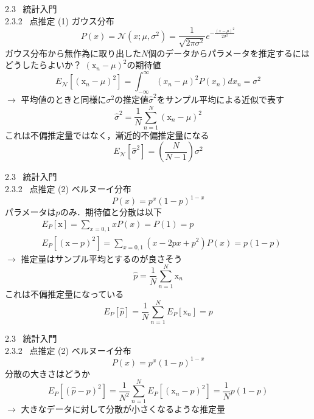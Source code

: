 \documentclass[dvipdfmx,10pt]{beamer}
\begin{document}
  \begin{frame}[t]{2.3 \ 統計入門 \\ \normalsize{2.3.2 \ 点推定}}
    (1) ガウス分布
    \begin{equation*}
      P(x)=\mathcal{N}(x;\mu,\sigma^2)=\frac{1}{\sqrt{2\pi \sigma^2}}e^{-\frac{(x-\mu)^2}{2\sigma^2}}
    \end{equation*}
    ガウス分布から無作為に取り出した$N$個のデータからパラメータを推定するにはどうしたらよいか？
    $(\mathrm{x}_n - \mu)^2$の期待値
    \begin{equation*}
      E_{\mathcal{N}}[(\mathrm{x}_n - \mu)^2] = \int_{-\infty}^{\infty}(x_n - \mu)^2 P(x_n) dx_n = \sigma^2
    \end{equation*}
    $\rightarrow$ 平均値のときと同様に$\sigma^2$の推定値$\hat{\sigma}^2$をサンプル平均による近似で表す
    \begin{equation*}
      \hat{\sigma}^2 = \frac{1}{N}\sum_{n=1}^{N}(\mathrm{x}_n - \mu)^2
    \end{equation*}
    これは不偏推定量ではなく，漸近的不偏推定量になる
    \begin{equation*}
      E_{\mathcal{N}}[\hat{\sigma}^2] = \left( \frac{N}{N-1}\right)\sigma^2
    \end{equation*}
  \end{frame}

  \begin{frame}[t]{2.3 \ 統計入門 \\ \normalsize{2.3.2 \ 点推定}}
    (2) ベルヌーイ分布
    \begin{equation*}
      P(x)=p^x(1-p)^{1-x}
    \end{equation*}
    パラメータは$p$のみ．期待値と分散は以下
    \begin{align*}
      &E_P[\mathrm{x}] = \sum_{x=0,1}xP(x) = P(1) = p\\
      &E_P[(\mathrm{x}-p)^2] = \sum_{x=0,1}(x -2px +p^2)P(x) = p(1-p)
    \end{align*}
    $\rightarrow$ 推定量はサンプル平均とするのが良さそう
    \begin{equation*}
      \hat{p} = \frac{1}{N}\sum_{n=1}^{N}\mathrm{x}_n
    \end{equation*}
    これは不偏推定量になっている
    \begin{equation*}
      E_P[\hat{p}] = \frac{1}{N}\sum_{n=1}^{N}E_P[\mathrm{x}_n] = p
    \end{equation*}
  \end{frame}

  \begin{frame}[t]{2.3 \ 統計入門 \\ \normalsize{2.3.2 \ 点推定}}
    (2) ベルヌーイ分布
    \begin{equation*}
      P(x)=p^x(1-p)^{1-x}
    \end{equation*}
    分散の大きさはどうか
    \begin{equation*}
      E_P[(\hat{p}-p)^2] = \frac{1}{N^2}\sum_{n=1}^{N}E_P[(\mathrm{x}_n-p)^2] = \frac{1}{N}p(1-p)
    \end{equation*}
    $\rightarrow$ 大きなデータに対して分散が小さくなるような推定量
  \end{frame}
\end{document}
